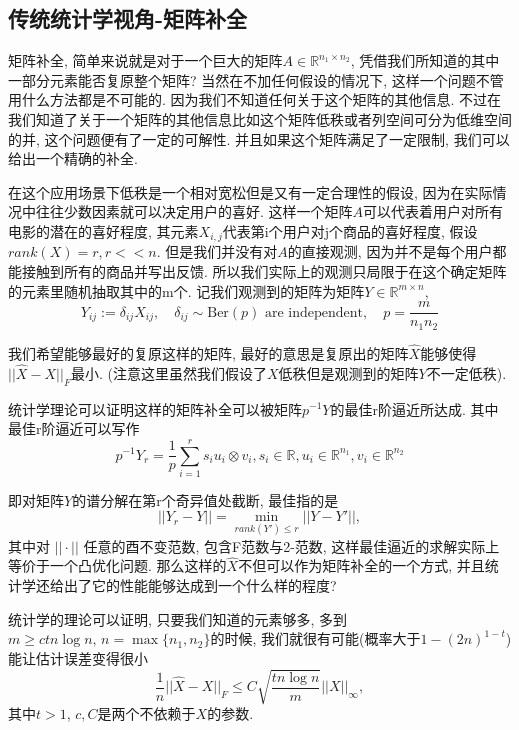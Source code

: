 \documentclass[lang=cn,11pt,a4paper]{elegantpaper}
\begin{document}
\subsection{传统统计学视角-矩阵补全}
\par 矩阵补全, 简单来说就是对于一个巨大的矩阵$A\in \mathbb{R}^{n_1\times n_2}$, 凭借我们所知道的其中一部分元素能否复原整个矩阵? 当然在不加任何假设的情况下, 这样一个问题不管用什么方法都是不可能的. 因为我们不知道任何关于这个矩阵的其他信息. 不过在我们知道了关于一个矩阵的其他信息比如这个矩阵低秩\cite{Candes2010}或者列空间可分为低维空间的并\cite{Eriksson2012}, 这个问题便有了一定的可解性. 并且如果这个矩阵满足了一定限制, 我们可以给出一个精确的补全\cite{Candes2009}.
\par 在这个应用场景下低秩是一个相对宽松但是又有一定合理性的假设, 因为在实际情况中往往少数因素就可以决定用户的喜好\cite{Candes2010}. 这样一个矩阵$A$可以代表着用户对所有电影的潜在的喜好程度, 其元素$X_{i,j}$代表第i个用户对j个商品的喜好程度, 假设$rank(X)=r, r<<n$. 但是我们并没有对$A$的直接观测, 因为并不是每个用户都能接触到所有的商品并写出反馈. 所以我们实际上的观测只局限于在这个确定矩阵的元素里随机抽取其中的m个. 记我们观测到的矩阵为矩阵$Y\in \mathbb{R}^{m\times n}$,
\begin{equation}
	Y_{ij}:=\delta_{ij}X_{ij}, \quad \delta_{ij} \sim \text{Ber}(p) \text{ are independent}, \quad p=\dfrac{m}{n_1n_2}
\end{equation}
\par 我们希望能够最好的复原这样的矩阵, 最好的意思是复原出的矩阵$\hat{X}$能够使得$||\hat{X}-X||_F$最小. (注意这里虽然我们假设了$X$低秩但是观测到的矩阵$Y$不一定低秩).
\par 统计学理论可以证明这样的矩阵补全可以被矩阵$p^{-1}Y$的最佳r阶逼近所达成\cite{Recht2011}. 其中最佳r阶逼近可以写作
\begin{equation}
	p^{-1}Y_r=\frac{1}{p}\sum_{i=1}^r s_i u_i \otimes v_i, s_i \in \mathbb R, u_i \in \mathbb R^{n_1}, v_i\in \mathbb R^{n_2}
\end{equation}

即对矩阵$Y$的谱分解在第r个奇异值处截断, 最佳指的是 
\begin{equation}
||Y_r-Y||=\min_{rank(Y')\leq r}||Y-Y'||,
\end{equation}
其中对 $||\cdot||$ 任意的酉不变范数, 包含F范数与2-范数, 这样最佳逼近的求解实际上等价于一个凸优化问题. 那么这样的$\hat X$不但可以作为矩阵补全的一个方式, 并且统计学还给出了它的性能能够达成到一个什么样的程度?
\par 统计学的理论可以证明, 只要我们知道的元素够多, 多到$m\geq ctn\log n,\, n=\max\{n_1,n_2\}$的时候, 我们就很有可能(概率大于$1-(2n)^{1-t}$)能让估计误差变得很小
\begin{equation}
	\dfrac{1}{n}||\hat X -X||_F\leq C\sqrt{\dfrac{tn\log n}{m}}||X||_{\infty},
\end{equation}
 其中$t>1$, $c,C$是两个不依赖于$X$的参数\cite{Recht2011}. 
 
\end{document}
